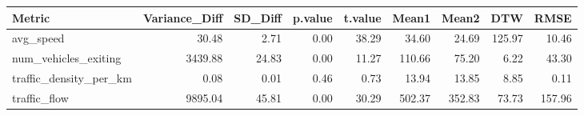 \begin{table}[ht]
\centering
\begin{tabular}{lrrrrrrrr}
  \hline
Metric & Variance\_Diff & SD\_Diff & p.value & t.value & Mean1 & Mean2 & DTW & RMSE \\ 
  \hline
avg\_speed & 30.48 & 2.71 & 0.00 & 38.29 & 34.60 & 24.69 & 125.97 & 10.46 \\ 
  num\_vehicles\_exiting & 3439.88 & 24.83 & 0.00 & 11.27 & 110.66 & 75.20 & 6.22 & 43.30 \\ 
  traffic\_density\_per\_km & 0.08 & 0.01 & 0.46 & 0.73 & 13.94 & 13.85 & 8.85 & 0.11 \\ 
  traffic\_flow & 9895.04 & 45.81 & 0.00 & 30.29 & 502.37 & 352.83 & 73.73 & 157.96 \\ 
   \hline
\end{tabular}
\end{table}
